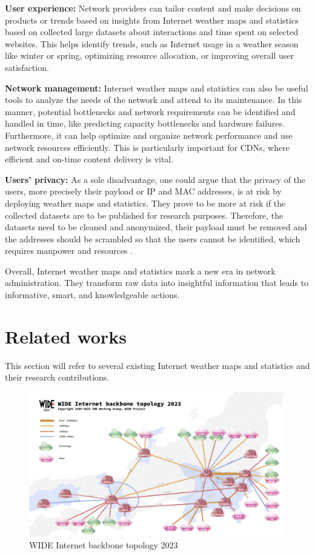 \documentclass[sigconf,authorversion,nonacm]{acmart}
\begin{document}
\textbf{User experience:} Network providers can tailor content and make decisions on products or trends based on insights from Internet weather maps and statistics based on collected large datasets about interactions and time spent on selected websites. This helps identify trends, such as Internet usage in a weather season like winter or spring, optimizing resource allocation, or improving overall user satisfaction.

\textbf{Network management:} Internet weather maps and statistics can also be useful tools to analyze the needs of the network and attend to its maintenance. In this manner, potential bottlenecks and network requirements can be identified and handled in time, like predicting capacity bottlenecks and hardware failures. Furthermore, it can help optimize and organize network performance and use network resources efficiently. This is particularly important for CDNs, where efficient and on-time content delivery is vital. 

\textbf{Users' privacy:} As a sole disadvantage, one could argue that the privacy of the users, more precisely their payload or IP and MAC addresses, is at risk by deploying weather maps and statistics. They prove to be more at risk if the collected datasets are to be published for research purposes. Therefore, the datasets need to be cleaned and anonymized, their payload must be removed and the addresses should be scrambled so that the users cannot be identified, which requires manpower and resources \cite{271335}.

Overall, Internet weather maps and statistics mark a new era in network administration. They transform raw data into insightful information that leads to informative, smart, and knowledgeable actions.

\section{Related works}
This section will refer to several existing Internet weather maps and statistics and their research contributions.
\begin{figure}
    \centering
    \includegraphics[width=\linewidth]{widebb-202309.png}
    \caption{WIDE Internet backbone topology 2023}
    \label{MAWI: WIDE Internet backbone topology 2023}
\end{figure}
\end{document}
